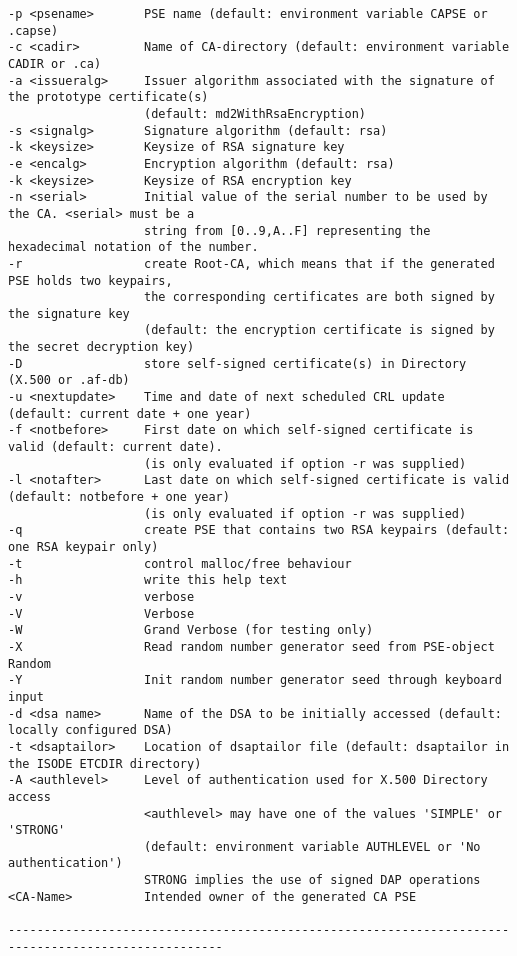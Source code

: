 {\begin{verbatim}
-p <psename>       PSE name (default: environment variable CAPSE or .capse)
-c <cadir>         Name of CA-directory (default: environment variable CADIR or .ca)
-a <issueralg>     Issuer algorithm associated with the signature of the prototype certificate(s)
                   (default: md2WithRsaEncryption)
-s <signalg>       Signature algorithm (default: rsa)
-k <keysize>       Keysize of RSA signature key
-e <encalg>        Encryption algorithm (default: rsa)
-k <keysize>       Keysize of RSA encryption key
-n <serial>        Initial value of the serial number to be used by the CA. <serial> must be a
                   string from [0..9,A..F] representing the hexadecimal notation of the number.
-r                 create Root-CA, which means that if the generated PSE holds two keypairs,
                   the corresponding certificates are both signed by the signature key
                   (default: the encryption certificate is signed by the secret decryption key)
-D                 store self-signed certificate(s) in Directory (X.500 or .af-db)
-u <nextupdate>    Time and date of next scheduled CRL update (default: current date + one year)
-f <notbefore>     First date on which self-signed certificate is valid (default: current date).
                   (is only evaluated if option -r was supplied)
-l <notafter>      Last date on which self-signed certificate is valid (default: notbefore + one year)
                   (is only evaluated if option -r was supplied)
-q                 create PSE that contains two RSA keypairs (default: one RSA keypair only)
-t                 control malloc/free behaviour
-h                 write this help text
-v                 verbose
-V                 Verbose
-W                 Grand Verbose (for testing only)
-X                 Read random number generator seed from PSE-object Random
-Y                 Init random number generator seed through keyboard input
-d <dsa name>      Name of the DSA to be initially accessed (default: locally configured DSA)
-t <dsaptailor>    Location of dsaptailor file (default: dsaptailor in the ISODE ETCDIR directory)
-A <authlevel>     Level of authentication used for X.500 Directory access
                   <authlevel> may have one of the values 'SIMPLE' or 'STRONG'
                   (default: environment variable AUTHLEVEL or 'No authentication')
                   STRONG implies the use of signed DAP operations
<CA-Name>          Intended owner of the generated CA PSE

----------------------------------------------------------------------------------------------------


\end{verbatim}}
